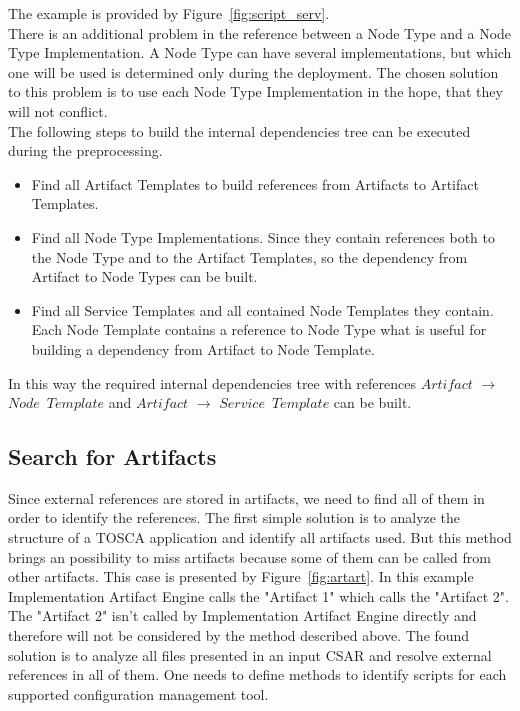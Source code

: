 The example is provided by Figure~\ref{fig:script_serv}.\\
There is an additional problem in the reference between a Node Type and a Node Type Implementation.
A Node Type can have several implementations, but which one will be used is determined only during the deployment. 
The chosen solution to this problem is to use each Node Type Implementation in the hope, that they will not conflict.\\
The following steps to build the internal dependencies tree can be executed during the preprocessing.
\begin{itemize}
	\item Find all Artifact Templates to build references from Artifacts to Artifact Templates.
	\item Find all Node Type Implementations. 
		Since they contain references both to the Node Type and to the Artifact Templates, so the dependency from Artifact to Node Types can be built.
	\item Find all Service Templates and all contained Node Templates they contain. 
		Each Node Template contains a reference to Node Type what is useful for building a dependency from Artifact to Node Template.
\end{itemize} 
In this way the required internal dependencies tree with references $Artifact$ $\rightarrow$ $Node$~$Template$ and $Artifact$ $\rightarrow$ $Service$~$Template$ can be built.


\subsection{Search for Artifacts}
Since external references are stored in artifacts, we need to find all of them in order to identify the references.
The first simple solution is to analyze the structure of a TOSCA application and identify all artifacts used.
But this method brings an possibility to miss artifacts because some of them can be called from other artifacts.
This case is presented by Figure~\ref{fig:artart}.
In this example Implementation Artifact Engine calls the "Artifact 1" which calls the "Artifact 2".
The "Artifact 2" isn't called by Implementation Artifact Engine directly and therefore will not be considered by the method described above.
The found solution is to analyze all files presented in an input CSAR and resolve external references in all of them.
One needs to define methods to identify scripts for each supported configuration management tool.


